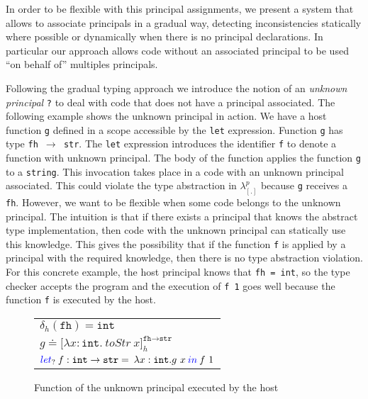 \documentclass{article}
\newcommand{\emb}[3]{\texttt{[}#1\texttt{]}_{#2}^{#3}}
\newcommand{\tslam}[3]{\lambda #1 : #2. \: #3}
\newcommand{\plet}[5]{\textcolor[rgb]{0,0,1}{let}_{#1} \: {#2}:{#3} = \: #4 \: \textcolor[rgb]{0,0,1}{in} \: #5}
\newcommand{\quotes}[1]{``#1''}
\newcommand\icode[1]{\texttt{#1}}
\newcommand\newcalculus[0]{$\lambda^p_{\left[.\right]}$}
\begin{document}
In order to be flexible with this principal assignments, we present a system that allows to associate principals in a gradual way, detecting inconsistencies statically where possible or dynamically when there is no principal declarations. In particular our approach allows code without an associated principal to be used \quotes{on behalf of} multiples principals.

Following the gradual typing approach we introduce the notion of an \emph{unknown principal} \icode{?} to deal with code that does not have a principal associated. The following example shows the unknown principal in action. We have a host function \icode{g} defined in a scope accessible by the \icode{let} expression. Function \icode{g} has type \icode{fh $\rightarrow$ str}. The \icode{let} expression introduces the identifier \icode{f} to denote a function with unknown principal. The body of the function applies the function \icode{g} to a \icode{string}. This invocation takes place in a code with an unknown principal associated. This could violate the type abstraction in \newcalculus{} because \icode{g} receives a \icode{fh}. However, we want to be flexible when some code belongs to the unknown principal. The intuition is that if there exists a principal that knows the abstract type implementation, then code with the unknown principal can statically use this knowledge. This gives the possibility that if the function \icode{f} is applied by a principal with the required knowledge, then there is no type abstraction violation. For this concrete example, the host principal knows that \icode{fh = int}, so the type checker accepts the program and the execution of \icode{f 1} goes well because the function \icode{f} is executed by the host.

\begin{figure}[!htbp]
\begin{center}
\begin{tabular}{l}
$\delta_h(\icode{fh}) = \icode{int}$ \\
$g \doteq \emb{\tslam{x}{\icode{int}}{toStr \: x}}{h}{\texttt{fh} \rightarrow \icode{str}}$ \\
$\plet{?}{f}{\icode{int} \rightarrow \icode{str}}{\lambda x: \icode{int}.g~x}{f~1}$ 
\end{tabular}
\end{center}
\vspace*{-5mm}
\caption{Function of the unknown principal executed by the host}%
\label{fig:gradual-motivation-1}%
\end{figure}
\end{document}
